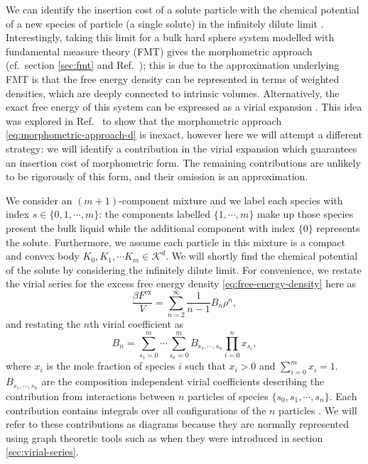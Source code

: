 \documentclass[11pt,twoside]{report}
\begin{document}
We can identify the insertion cost of a solute particle with the chemical potential of a new species of particle (a single solute) in the infinitely dilute limit \cite{ReissJCP1959,Hansen-GoosJPCM2006,Hansen-GoosJCP2014}.
Interestingly, taking this limit for a bulk hard sphere system modelled with fundamental measure theory (FMT) gives the morphometric approach (cf.\ section \ref{sec:fmt} and Ref.\ \cite{Hansen-GoosJPCM2006}); this is due to the approximation underlying FMT is that the free energy density can be represented in terms of weighted densities, which are deeply connected to intrinsic volumes.
Alternatively, the exact free energy of this system can be expressed as a virial expansion \cite{Hansen2013}.
This idea was explored in Ref.\ \cite{Hansen-GoosJPCM2006} to show that the morphometric approach \eqref{eq:morphometric-approach-d} is inexact, however here we will attempt a different strategy: we will identify a contribution in the virial expansion which guarantees an insertion cost of morphometric form.
The remaining contributions are unlikely to be rigorously of this form, and their omission is an approximation.

We consider an $(m+1)$-component mixture and we label each species with index $s \in \{0, 1, \cdots, m\}$: the components labelled $\{1, \cdots, m\}$ make up those species present the bulk liquid while the additional component with index $\{0\}$ represents the solute.
Furthermore, we assume each particle in this mixture is a compact and convex body $K_0, K_1, \cdots K_m \in \mathcal{K}^d$.
We will shortly find the chemical potential of the solute by considering the infinitely dilute limit.
For convenience, we restate the virial series for the excess free energy density \eqref{eq:free-energy-density} here as
\begin{equation}
  \frac{\beta F^\mathrm{ex}}{V}
  =
  \sum_{n=2}^\infty
  \frac{1}{n-1}
  B_n
  \rho^n,
\end{equation}
and restating the $n$th virial coefficient \label{eq:virial-coefficients-mixtures} as
\begin{equation}
  B_n
  =
  \sum_{s_1=0}^m \cdots \sum_{s_n=0}^m
  B_{s_1, \cdots, s_n} \prod_{i=0}^n x_{s_i},
\end{equation}
where $x_i$ is the mole fraction of species $i$ such that $x_i > 0$ and $\sum_{i=0}^m x_i = 1$.
$B_{s_1, \cdots, s_n}$ are the composition independent virial coefficients describing the contribution from interactions between $n$ particles of species $\{s_0, s_1, \cdots, s_n\}$.
Each contribution contains integrals over all configurations of the $n$ particles \cite{Hansen2013,Santos2016}.
We will refer to these contributions as diagrams because they are normally represented using graph theoretic tools such as when they were introduced in section \ref{sec:virial-series}.
\end{document}
